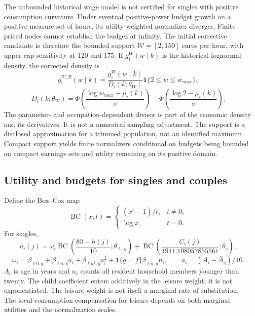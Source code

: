 \documentclass[11pt,a4paper]{article}
\newcommand{\BC}{\operatorname{BC}}
\newcommand{\ind}{\mathbf 1}
\begin{document}
The unbounded historical wage model is not certified for singles with positive
consumption curvature. Under eventual positive-power budget growth on a
positive-measure set of hours, its utility-weighted normalizer diverges. Finite
priced nodes cannot establish the budget at infinity. The initial corrective
candidate is therefore the bounded support $\mathcal W=[2,150]$ euros per hour,
with upper-cap sensitivity at $120$ and $175$. If
$g_i^W(w\mid k)$ is the historical lognormal density, the corrected density is
\begin{equation}
g_i^{W,B}(w\mid k)=
\frac{g_i^W(w\mid k)}{D_i(k;\theta_W)}\ind\{2\leq w\leq w_{max}\},
\end{equation}
\begin{equation}
D_i(k;\theta_W)=
\Phi\!\left(\frac{\log w_{max}-\mu_i(k)}{\sigma}\right)-
\Phi\!\left(\frac{\log 2-\mu_i(k)}{\sigma}\right).
\label{eq:trunc}
\end{equation}
The parameter- and occupation-dependent divisor is part of the economic density
and its derivatives. It is not a numerical sampling adjustment. The support is
a disclosed approximation for a trimmed population, not an identified maximum.
Compact support yields finite normalizers conditional on budgets being bounded
on compact earnings sets and utility remaining on its positive domain.

\subsection{Utility and budgets for singles and couples}

Define the Box--Cox map
\begin{equation}
\BC(x;t)=\begin{cases}(x^t-1)/t,&t\neq0,\\ \log x,&t=0.\end{cases}
\end{equation}
For singles,
\begin{equation}
u_i(j)=\omega_i\BC\!\left(\frac{80-h(j)}{10};\theta_{\ell,g}\right)
+\BC\!\left(\frac{C_i(j)}{1911.108057855561};\theta_c\right),
\label{eq:singleutility}
\end{equation}
\begin{equation}
\omega_i=\beta_{\ell0,g}+\beta_{\ell a,g}a_i
+\beta_{\ell a^2,g}a_i^2+\ind\{g=f\}\beta_{\ell n,g}n_i,
\qquad a_i=(A_i-\bar A_g)/10.
\end{equation}
$A_i$ is age in years and $n_i$ counts all resident household members younger
than twenty. The child coefficient enters additively in the leisure weight; it
is not exponentiated. The leisure weight is not itself a marginal rate of
substitution. The local consumption compensation for leisure depends on both
marginal utilities and the normalization scales.
\end{document}
